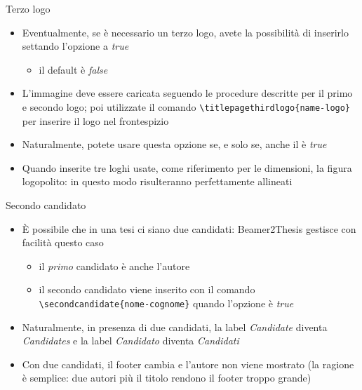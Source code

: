 \begin{frame}[fragile]{Terzo logo}
\begin{itemize}
\item Eventualmente, se è necessario un terzo logo, avete la possibilità di inserirlo settando l'opzione  a \emph{true}
\begin{itemize}
\item il default è \emph{false}
\end{itemize}
\item L'immagine deve essere caricata seguendo le procedure descritte per il primo e secondo logo; poi utilizzate il comando \verb!\titlepagethirdlogo{name-logo}! per inserire il logo nel frontespizio
\item Naturalmente, potete usare questa opzione se, e solo se, anche il  è \emph{true}
\item Quando inserite tre loghi usate, come riferimento per le dimensioni, la figura \alert{logopolito}: in questo modo risulteranno perfettamente allineati
\end{itemize}
\end{frame}

\begin{frame}[t,fragile]{Secondo candidato}
\begin{itemize}
\item \`{E} possibile che in una tesi ci siano due candidati: Beamer2Thesis gestisce con facilità questo caso
\begin{itemize}
\item il \emph{primo} candidato è anche l'autore
\item il secondo candidato viene inserito con il comando \verb!\secondcandidate{nome-cognome}! quando l'opzione  è \emph{true}
\end{itemize}
\item Naturalmente, in presenza di due candidati, la label \emph{Candidate} diventa \emph{Candidates} e la label \emph{Candidato} diventa \emph{Candidati}
\item Con due candidati, il footer cambia e l'autore non viene mostrato (la ragione è semplice: due autori più il titolo rendono il footer troppo grande)
\end{itemize}
\end{frame}

